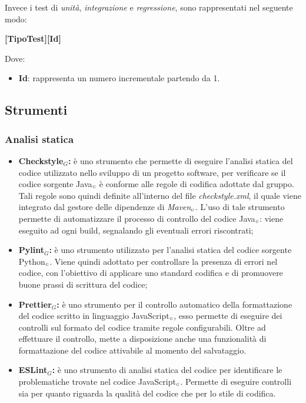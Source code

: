 Invece i test di \textit{unità}, \textit{integrazione} e \textit{regressione}, sono rappresentati nel seguente modo:
\begin{center}
	\textbf{[TipoTest][Id]}
\end{center}
Dove:
\begin{itemize}
	\item \textbf{Id}: rappresenta un numero incrementale partendo da 1.
\end{itemize}

\subsection{Strumenti} \label{ProcessiDiSupportoVerificaStrumenti}
\subsubsection{Analisi statica} \label{ProcessiDiSupportoVerificaStrumentiAnalisiStatica}
\begin{itemize}
	\item \textbf{Checkstyle$_G$:} è uno strumento che permette di eseguire l’analisi statica del codice utilizzato nello sviluppo di un progetto software, per verificare se il codice sorgente Java$_{\scaleto{G}{3pt}}$ è conforme alle regole di codifica adottate dal gruppo. Tali regole sono quindi definite all’interno del file \textit{checkstyle.xml}, il quale viene integrato dal gestore delle dipendenze di \textit{Maven$_{\scaleto{G}{3pt}}$}. L’uso di tale strumento permette di automatizzare  il processo di controllo del codice Java$_{\scaleto{G}{3pt}}$: viene eseguito ad ogni build, segnalando gli eventuali errori riscontrati; 
	\item \textbf{Pylint$_G$:} è uno strumento utilizzato per l’analisi statica del codice sorgente Python$_{\scaleto{G}{3pt}}$. Viene quindi adottato per controllare la presenza di errori nel codice, con l’obiettivo di applicare uno standard codifica e di promuovere buone prassi di scrittura del codice;
	\item \textbf{Prettier$_G$:} è uno strumento per il controllo automatico della formattazione del codice scritto in linguaggio JavaScript$_{\scaleto{G}{3pt}}$, esso permette di eseguire dei controlli sul formato del codice tramite regole configurabili.
	Oltre ad effettuare il controllo, mette a disposizione anche una funzionalità di formattazione del codice attivabile al momento del salvataggio.
	\item \textbf{ESLint$_G$:} è uno strumento di analisi statica del codice per identificare le problematiche trovate nel codice JavaScript$_{\scaleto{G}{3pt}}$. Permette di eseguire controlli sia per quanto riguarda la qualità del codice che per lo stile di codifica.
\end{itemize}
